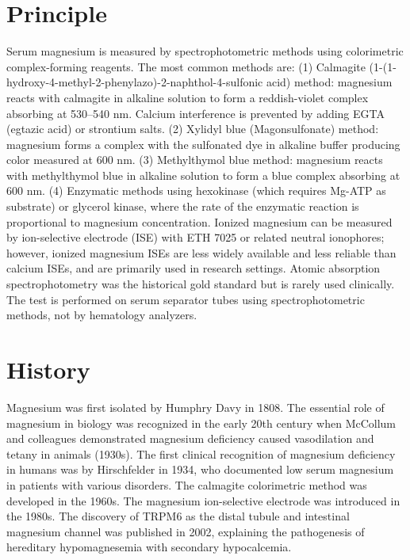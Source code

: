 \section*{Principle}
Serum magnesium is measured by spectrophotometric methods using colorimetric complex-forming reagents. The most common methods are: (1) Calmagite (1-(1-hydroxy-4-methyl-2-phenylazo)-2-naphthol-4-sulfonic acid) method: magnesium reacts with calmagite in alkaline solution to form a reddish-violet complex absorbing at 530--540 nm. Calcium interference is prevented by adding EGTA (egtazic acid) or strontium salts. (2) Xylidyl blue (Magonsulfonate) method: magnesium forms a complex with the sulfonated dye in alkaline buffer producing color measured at 600 nm. (3) Methylthymol blue method: magnesium reacts with methylthymol blue in alkaline solution to form a blue complex absorbing at 600 nm. (4) Enzymatic methods using hexokinase (which requires Mg-ATP as substrate) or glycerol kinase, where the rate of the enzymatic reaction is proportional to magnesium concentration. Ionized magnesium can be measured by ion-selective electrode (ISE) with ETH 7025 or related neutral ionophores; however, ionized magnesium ISEs are less widely available and less reliable than calcium ISEs, and are primarily used in research settings. Atomic absorption spectrophotometry was the historical gold standard but is rarely used clinically. The test is performed on serum separator tubes using spectrophotometric methods, not by hematology analyzers.

\section*{History}
Magnesium was first isolated by Humphry Davy in 1808. The essential role of magnesium in biology was recognized in the early 20th century when McCollum and colleagues demonstrated magnesium deficiency caused vasodilation and tetany in animals (1930s). The first clinical recognition of magnesium deficiency in humans was by Hirschfelder in 1934, who documented low serum magnesium in patients with various disorders. The calmagite colorimetric method was developed in the 1960s. The magnesium ion-selective electrode was introduced in the 1980s. The discovery of TRPM6 as the distal tubule and intestinal magnesium channel was published in 2002, explaining the pathogenesis of hereditary hypomagnesemia with secondary hypocalcemia.

